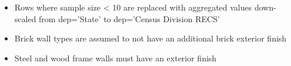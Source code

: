 \begin{itemize}
\item Rows where sample size < 10 are replaced with aggregated values down-scaled from dep='State' to dep='Census Division RECS'
\item Brick wall types are assumed to not have an additional brick exterior finish
\item Steel and wood frame walls must have an exterior finish
\end{itemize}

